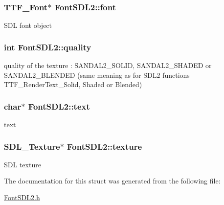 \subsubsection[{\texorpdfstring{font}{font}}]{\setlength{\rightskip}{0pt plus 5cm}T\+T\+F\+\_\+\+Font$\ast$ Font\+S\+D\+L2\+::font}\hypertarget{structFontSDL2_a4473d0cf1fe867daeabb4106962d355e}{}\label{structFontSDL2_a4473d0cf1fe867daeabb4106962d355e}
S\+DL font object 
\subsubsection[{\texorpdfstring{quality}{quality}}]{\setlength{\rightskip}{0pt plus 5cm}int Font\+S\+D\+L2\+::quality}\hypertarget{structFontSDL2_a2aa630dfe74ff80adee30fa5bc62da3f}{}\label{structFontSDL2_a2aa630dfe74ff80adee30fa5bc62da3f}
quality of the texture \+: S\+A\+N\+D\+A\+L2\+\_\+\+S\+O\+L\+ID, S\+A\+N\+D\+A\+L2\+\_\+\+S\+H\+A\+D\+ED or S\+A\+N\+D\+A\+L2\+\_\+\+B\+L\+E\+N\+D\+ED (same meaning as for S\+D\+L2 functions T\+T\+F\+\_\+\+Render\+Text\+\_\+\+Solid, Shaded or Blended) 
\subsubsection[{\texorpdfstring{text}{text}}]{\setlength{\rightskip}{0pt plus 5cm}char$\ast$ Font\+S\+D\+L2\+::text}\hypertarget{structFontSDL2_a2ebfe0c160217282ef912e1785894c2c}{}\label{structFontSDL2_a2ebfe0c160217282ef912e1785894c2c}
text 
\subsubsection[{\texorpdfstring{texture}{texture}}]{\setlength{\rightskip}{0pt plus 5cm}S\+D\+L\+\_\+\+Texture$\ast$ Font\+S\+D\+L2\+::texture}\hypertarget{structFontSDL2_af8f18f11af2195bd21d120426ba89750}{}\label{structFontSDL2_af8f18f11af2195bd21d120426ba89750}
S\+DL texture 

The documentation for this struct was generated from the following file\+:\begin{DoxyCompactItemize}
\item 
\hyperlink{FontSDL2_8h}{Font\+S\+D\+L2.\+h}\end{DoxyCompactItemize}

